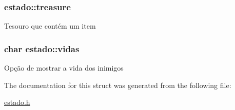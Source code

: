 \subsubsection[{\texorpdfstring{treasure}{treasure}}]{ estado\+::treasure}\hypertarget{structestado_ae4cc2103608d31c5a97732cc6411334a}{}\label{structestado_ae4cc2103608d31c5a97732cc6411334a}
Tesouro que contém um item 
\subsubsection[{\texorpdfstring{vidas}{vidas}}]{\setlength{\rightskip}{0pt plus 5cm}char estado\+::vidas}\hypertarget{structestado_a1dcd7329b4a4cd561a7b72b2552f1d6c}{}\label{structestado_a1dcd7329b4a4cd561a7b72b2552f1d6c}
Opção de mostrar a vida dos inimigos 

The documentation for this struct was generated from the following file\+:\begin{DoxyCompactItemize}
\item 
\hyperlink{estado_8h}{estado.\+h}\end{DoxyCompactItemize}
